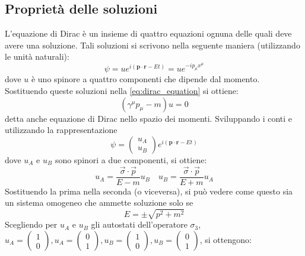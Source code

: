 \documentclass{subnucbo}
\begin{document}
\subsection{Proprietà delle soluzioni}
L'equazione di Dirac è un insieme di quattro equazioni ognuna delle quali deve avere una soluzione.
Tali soluzioni si scrivono nella seguente maniera (utilizzando le unità naturali):
\begin{equation}
        \psi = u e ^ { i ( \mathbf { p } \cdot \mathbf { r } - E t ) } = u e ^ { - i p _ { \mu } x ^ { \mu } }
        \label{eq:dirac_sol}
\end{equation}
dove $u$ è uno spinore a quattro componenti che dipende dal momento. Sostituendo queste soluzioni nella \ref{eq:dirac_equation} si ottiene:
\begin{equation}
        \left( \gamma ^ { \mu } p _ { \mu } - m \right) u = 0
        \label{eq:dirac_eq_momentum}
\end{equation}
detta anche equazione di Dirac nello spazio dei momenti. Sviluppando i conti e utilizzando la rappresentazione
\begin{equation}
        \psi = \left( \begin{array} { l } { u_{A} } \\ { u_{B} } \end{array} \right) e ^ { i ( \mathbf { p } \cdot \mathbf { r } - E t ) }
        \label{eq:dirac_sol_spinors}
\end{equation}
dove $u_{A}$ e $u_{B}$ sono spinori a due componenti, si ottiene:
\begin{equation}
        u _ { A } = \frac { \vec { \sigma } \cdot \vec { p } } { E - m } u _ { B } \quad u _ { B } = \frac { \vec { \sigma } \cdot \vec { p } } { E + m } u _ { A }
\end{equation}
Sostituendo la prima nella seconda (o viceversa), si può vedere come questo sia un sistema omogeneo che ammette soluzione solo se
\begin{equation}
        E = \pm \sqrt { p ^ { 2 } + m ^ { 2 } }
        \label{eq:energy}
\end{equation}
Scegliendo per $u_{A}$ e $u_{B}$ gli autostati dell'operatore $\sigma_{3}$, $u _ { A } = \left( \begin{array} { c } { 1 } \\ { 0 } \end{array} \right) , u _ { A } = \left( \begin{array} { l } { 0 } \\ { 1 } \end{array} \right), u _ { B } = \left( \begin{array} { c } { 1 } \\ { 0 } \end{array} \right) , u _ { B } = \left( \begin{array} { l } { 0 } \\ { 1 } \end{array} \right)$, si ottengono:
\end{document}
